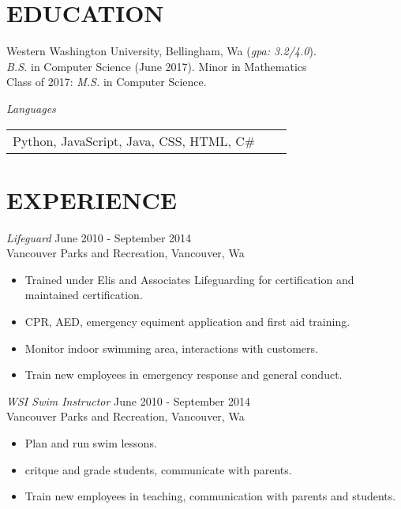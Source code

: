 \documentclass[line,margin]{res}
\begin{document}
\address{1034 24th Street Apt 5 Bellingham, WA 98225}
\address{(360) 931-3237 rainierharvey@gmail.com, rainierharvey.me}
 
\begin{resume}
 
\section{EDUCATION}   Western Washington University, Bellingham, Wa ({\sl gpa: 3.2/4.0}).\\
			     {\sl B.S.} in Computer Science (June 2017). Minor in Mathematics\\
			      Class of 2017: {\sl M.S.} in Computer Science.
			      
 {\sl Languages} 
	\begin{table}[h]
		\begin{tabular}{l l l}
			Python, JavaScript, Java, CSS, HTML, C\#	
		\end{tabular}
 	\end{table}

\section{EXPERIENCE}

		{\sl Lifeguard} \hfill June 2010 - September 2014 \\
                	Vancouver Parks and Recreation, Vancouver, Wa
               	 \begin{itemize}  \itemsep -2pt
                		\item Trained under Elis and Associates Lifeguarding for certification and maintained certification.
                		\item CPR, AED, emergency equiment application and first aid training.
                		\item Monitor indoor swimming area, interactions with customers.
						\item Train new employees in emergency response and general conduct.
                	\end{itemize}

        {\sl WSI Swim Instructor} \hfill June 2010 - September 2014 \\
                	Vancouver Parks and Recreation, Vancouver, Wa
                  	\begin{itemize} \itemsep -2pt
                   		\item Plan and run swim lessons.
			\item critque and grade students, communicate with parents.
			\item Train new employees in teaching, communication with parents and students.
                   	\end{itemize}


\end{resume}
\end{document}
